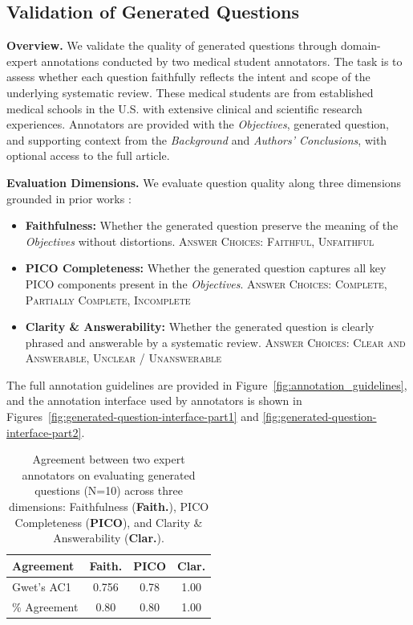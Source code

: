 \documentclass{article}
\newcommand{\xhdr}[1]{%
  \noindent\textbf{#1.}
}
\begin{document}
\subsection{Validation of Generated Questions}\label{appendix:question-gen-validation}

\xhdr{Overview} We validate the quality of generated questions through domain-expert annotations conducted by two medical student annotators. The task is to assess whether each question faithfully reflects the intent and scope of the underlying systematic review. These medical students are from established medical schools in the U.S. with extensive clinical and scientific research experiences. Annotators are provided with the \textit{Objectives}, generated question, and supporting context from the \textit{Background} and \textit{Authors' Conclusions}, with optional access to the full article.


\xhdr{Evaluation Dimensions} We evaluate question quality along three dimensions grounded in prior works \cite{kaur2025whosaskingsimulatingrolebased, mir-etal-2019-evaluating, park-etal-2024-valuescope, pico_framework}:
\begin{itemize}[leftmargin=0.6cm]
    \item \textbf{Faithfulness:} Whether the generated question preserve the meaning of the \textit{Objectives} without distortions. \textsc{Answer Choices: Faithful, Unfaithful}
    \item \textbf{PICO Completeness:} Whether the generated question captures all key PICO components present in the \textit{Objectives}. \textsc{Answer Choices: Complete, Partially Complete, Incomplete}
    \item \textbf{Clarity \& Answerability:} Whether the generated question is clearly phrased and answerable by a systematic review. \textsc{Answer Choices: Clear and Answerable, Unclear / Unanswerable}
\end{itemize}

The full annotation guidelines are provided in Figure~\ref{fig:annotation_guidelines}, and the annotation interface used by annotators is shown in Figures~\ref{fig:generated-question-interface-part1} and \ref{fig:generated-question-interface-part2}.

\begin{table}
\vspace{-12pt}
\centering
\small
\caption{Agreement between two expert annotators on evaluating generated questions (N=10) across three dimensions: Faithfulness (\textbf{Faith.}), PICO Completeness (\textbf{PICO}), and Clarity \& Answerability (\textbf{Clar.}).}
\setlength{\tabcolsep}{3.5pt}
\begin{tabular}{lccc}
\toprule
\textbf{Agreement} & \textbf{Faith.} & \textbf{PICO} & \textbf{Clar.} \\
\midrule
Gwet's AC1   & 0.756 & 0.78 & 1.00 \\
\% Agreement & 0.80  & 0.80 & 1.00 \\
\bottomrule
\end{tabular}
\label{tab:interrater}
\vspace{-7pt}
\end{table}
\end{document}
